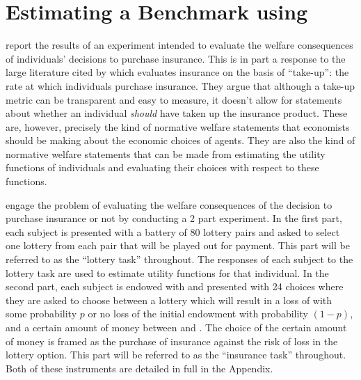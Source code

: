 \documentclass[../main.tex]{subfiles}
\begin{document}
\section{Estimating a Benchmark using \texorpdfstring{\textcite{Harrison2016}}{Harrison and Ng (2015)}}
\label{sec4:Bench}

\textcite{Harrison2016} report the results of an experiment intended to evaluate the welfare consequences of individuals' decisions to purchase insurance.
This is in part a response to the large literature cited by \textcite[1]{Harrison2016} which evaluates insurance on the basis of \enquote{take-up}: the rate at which individuals purchase insurance.
They argue that although a take-up metric can be transparent and easy to measure, it doesn't allow for statements about whether an individual \textit{should} have taken up the insurance product.
These are, however, precisely the kind of normative welfare statements that economists should be making about the economic choices of agents.
They are also the kind of normative welfare statements that can be made from estimating the utility functions of individuals and evaluating their choices with respect to these functions.


\textcite{Harrison2016} engage the problem of evaluating the welfare consequences of the decision to purchase insurance or not by conducting a 2 part experiment.
In the first part, each subject is presented with a battery of 80 lottery pairs and asked to select one lottery from each pair that will be played out for payment.
This part will be referred to as the \enquote{lottery task} throughout.
The responses of each subject to the lottery task are used to estimate utility functions for that individual.
In the second part, each subject is endowed with  and presented with 24 choices where they are asked to choose between a lottery which will result in a loss of  with some probability $p$ or no loss of the initial endowment with probability $(1-p)$, and a certain amount of money between  and .
The choice of the certain amount of money is framed as the purchase of insurance against the risk of loss in the lottery option.
This part will be referred to as the \enquote{insurance task} throughout.
Both of these instruments are detailed in full in the Appendix.
\end{document}
